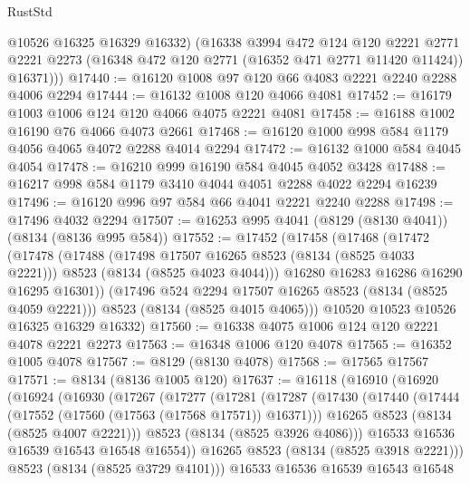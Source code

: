 \begin{lexlean}{RustStd}
\begin{coremodule}
{\begin{coremodule}
{{{{{{{{{{{{{{{{{{{{{{{{{{{{{{{{{{{{{{{{{{{{{{{{{{{{{          @10526
          @16325
          @16329
          @16332)
        (@16338
          @3994
          @472
          @124
          @120
          @2221
          @2771
          @2221
          @2273
          (@16348 @472 @120 @2771 (@16352 @471 @2771 @11420 @11424))
          @16371)))
@17440 := @16120 @1008 @97 @120 @66 @4083 @2221 @2240 @2288 @4006 @2294
@17444 := @16132 @1008 @120 @4066 @4081
@17452 := @16179 @1003 @1006 @124 @120 @4066 @4075 @2221 @4081
@17458 := @16188 @1002 @16190 @76 @4066 @4073 @2661
@17468 := @16120 @1000 @998 @584 @1179 @4056 @4065 @4072 @2288 @4014 @2294
@17472 := @16132 @1000 @584 @4045 @4054
@17478 := @16210 @999 @16190 @584 @4045 @4052 @3428
@17488 := @16217 @998 @584 @1179 @3410 @4044 @4051 @2288 @4022 @2294 @16239
@17496 := @16120 @996 @97 @584 @66 @4041 @2221 @2240 @2288
@17498 := @17496 @4032 @2294
@17507 := @16253 @995 @4041 (@8129 (@8130 @4041)) (@8134 (@8136 @995 @584))
@17552 := @17452
    (@17458
      (@17468
        (@17472
          (@17478
            (@17488
              (@17498 @17507 @16265 @8523 (@8134 (@8525 @4033 @2221)))
              @8523
              (@8134 (@8525 @4023 @4044)))
            @16280
            @16283
            @16286
            @16290
            @16295
            @16301))
        (@17496 @524 @2294 @17507 @16265 @8523 (@8134 (@8525 @4059 @2221)))
        @8523
        (@8134 (@8525 @4015 @4065)))
      @10520
      @10523
      @10526
      @16325
      @16329
      @16332)
@17560 := @16338 @4075 @1006 @124 @120 @2221 @4078 @2221 @2273
@17563 := @16348 @1006 @120 @4078
@17565 := @16352 @1005 @4078
@17567 := @8129 (@8130 @4078)
@17568 := @17565 @17567
@17571 := @8134 (@8136 @1005 @120)
@17637 := @16118
    (@16910
      (@16920
        (@16924
          (@16930
            (@17267
              (@17277
                (@17281
                  (@17287
                    (@17430
                      (@17440
                        (@17444 (@17552 (@17560 (@17563 (@17568 @17571)) @16371)))
                        @16265
                        @8523
                        (@8134 (@8525 @4007 @2221)))
                      @8523
                      (@8134 (@8525 @3926 @4086)))
                    @16533
                    @16536
                    @16539
                    @16543
                    @16548
                    @16554))
                @16265
                @8523
                (@8134 (@8525 @3918 @2221)))
              @8523
              (@8134 (@8525 @3729 @4101)))
            @16533
            @16536
            @16539
            @16543
            @16548
}}}}}}}}}}}}}}}}}}}}}}}}}}}}}}}}}}}}}}}}}}}}}}}}}}}}}
\end{coremodule}}
\end{coremodule}
\end{lexlean}
